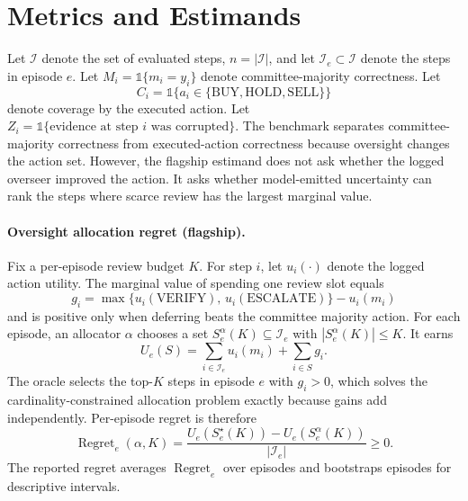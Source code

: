 \documentclass[10pt,twocolumn]{article}
\newcommand{\indicator}{\mathbb{1}}
\newcommand{\I}{\mathcal{I}}
\begin{document}
\section{Metrics and Estimands}

Let \(\I\) denote the set of evaluated steps, \(n=|\I|\), and let \(\I_e\subset\I\) denote the steps in episode \(e\). Let \(M_i=\indicator\{m_i=y_i\}\) denote committee-majority correctness. Let
\[
C_i=\indicator\{a_i\in\{\mathrm{BUY},\mathrm{HOLD},\mathrm{SELL}\}\}
\]
denote coverage by the executed action. Let \(Z_i=\indicator\{\text{evidence at step }i\text{ was corrupted}\}\). The benchmark separates committee-majority correctness from executed-action correctness because oversight changes the action set. However, the flagship estimand does not ask whether the logged overseer improved the action. It asks whether model-emitted uncertainty can rank the steps where scarce review has the largest marginal value.

\paragraph{Oversight allocation regret (flagship).}
Fix a per-episode review budget \(K\). For step \(i\), let \(u_i(\cdot)\) denote the logged action utility. The marginal value of spending one review slot equals
\[
g_i = \max\{u_i(\mathrm{VERIFY}),\,u_i(\mathrm{ESCALATE})\} - u_i(m_i)
\]
and is positive only when deferring beats the committee majority action. For each episode, an allocator \(\alpha\) chooses a set \(S_e^\alpha(K)\subseteq \I_e\) with \(|S_e^\alpha(K)|\le K\). It earns
\begin{equation}
\label{eq:episode-utility}
U_e(S)=\sum_{i\in\I_e}u_i(m_i)+\sum_{i\in S}g_i.
\end{equation}
The oracle selects the top-\(K\) steps in episode \(e\) with \(g_i>0\), which solves the cardinality-constrained allocation problem exactly because gains add independently. Per-episode regret is therefore
\begin{equation}
\operatorname{Regret}_e(\alpha,K)=
\frac{U_e(S_e^\star(K))-U_e(S_e^\alpha(K))}{|\I_e|}\ge 0.
\label{eq:regret}
\end{equation}
The reported regret averages \(\operatorname{Regret}_e\) over episodes and bootstraps episodes for descriptive intervals.
\end{document}
